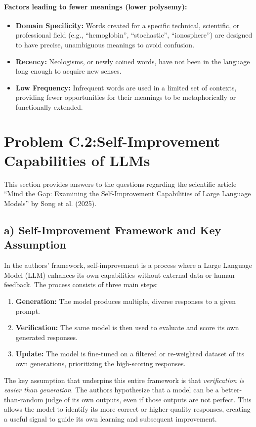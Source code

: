 \documentclass{solutionclass} %
\begin{document}
\paragraph{Factors leading to fewer meanings (lower polysemy):}
\begin{itemize}
    \item \textbf{Domain Specificity:} Words created for a specific technical, scientific, or professional field (e.g., ``hemoglobin'', ``stochastic'', ``ionosphere'') are designed to have precise, unambiguous meanings to avoid confusion.
    \item \textbf{Recency:} Neologisms, or newly coined words, have not been in the language long enough to acquire new senses.
    \item \textbf{Low Frequency:} Infrequent words are used in a limited set of contexts, providing fewer opportunities for their meanings to be metaphorically or functionally extended.
\end{itemize}

\clearpage

\section{Problem C.2:\@ Self-Improvement Capabilities of LLMs}\label{sec:problem_c2}
This section provides answers to the questions regarding the scientific article ``Mind the Gap: Examining the Self-Improvement Capabilities of Large Language Models'' by Song et al. (2025).

\subsection{a) Self-Improvement Framework and Key Assumption}
In the authors' framework, self-improvement is a process where a Large Language Model (LLM) enhances its own capabilities without external data or human feedback. The process consists of three main steps:
\begin{enumerate}
    \item \textbf{Generation:} The model produces multiple, diverse responses to a given prompt.
    \item \textbf{Verification:} The same model is then used to evaluate and score its own generated responses.
    \item \textbf{Update:} The model is fine-tuned on a filtered or re-weighted dataset of its own generations, prioritizing the high-scoring responses.
\end{enumerate}
The key assumption that underpins this entire framework is that \emph{verification is easier than generation}. The authors hypothesize that a model can be a better-than-random judge of its own outputs, even if those outputs are not perfect. This allows the model to identify its more correct or higher-quality responses, creating a useful signal to guide its own learning and subsequent improvement.
\end{document}

